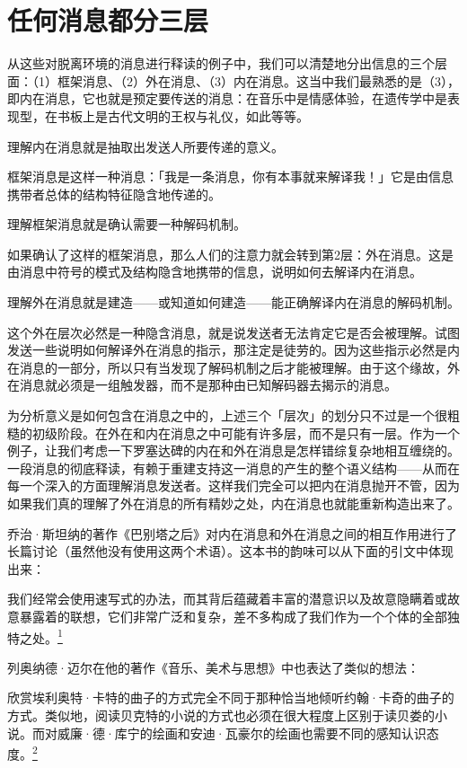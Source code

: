 \documentclass[
  12pt,
  twoside,
  openright,
  oldfontcommands,
]{memoir}
\newenvironment{fsquote}{%
  \begin{mdframed}[style=gebquote]\kaitifamily\small%
}{%
  \end{mdframed}%
}
\begin{document}
\section{任何消息都分三层}

从这些对脱离环境的消息进行释读的例子中，我们可以清楚地分出信息的三个层面：（1）框架消息、（2）外在消息、（3）内在消息。这当中我们最熟悉的是（3），即内在消息，它也就是预定要传送的消息：在音乐中是情感体验，在遗传学中是表现型，在书板上是古代文明的王权与礼仪，如此等等。

{理解内在消息就是抽取出发送人所要传递的意义。}

框架消息是这样一种消息：「我是一条消息，你有本事就来解译我！」它是由信息携带者总体的结构特征隐含地传递的。

{理解框架消息就是确认需要一种解码机制。}

如果确认了这样的框架消息，那么人们的注意力就会转到第2层：外在消息。这是由消息中符号的模式及结构隐含地携带的信息，说明如何去解译内在消息。

{理解外在消息就是建造------或知道如何建造------能正确解译内在消息的解码机制。}

这个外在层次必然是一种隐含消息，就是说发送者无法肯定它是否会被理解。试图发送一些说明如何解译外在消息的指示，那注定是徒劳的。因为这些指示必然是内在消息的一部分，所以只有当发现了解码机制之后才能被理解。由于这个缘故，外在消息就必须是一组触发器，而不是那种由已知解码器去揭示的消息。

为分析意义是如何包含在消息之中的，上述三个「层次」的划分只不过是一个很粗糙的初级阶段。在外在和内在消息之中可能有许多层，而不是只有一层。作为一个例子，让我们考虑一下罗塞达碑的内在和外在消息是怎样错综复杂地相互缠绕的。一段消息的彻底释读，有赖于重建支持这一消息的产生的整个语义结构------从而在每一个深入的方面理解消息发送者。这样我们完全可以把内在消息抛开不管，因为如果我们真的理解了外在消息的所有精妙之处，内在消息也就能重新构造出来了。

乔治·斯坦纳的著作《巴别塔之后》对内在消息和外在消息之间的相互作用进行了长篇讨论（虽然他没有使用这两个术语）。这本书的韵味可以从下面的引文中体现出来：

\begin{fsquote}
我们经常会使用速写式的办法，而其背后蕴藏着丰富的潜意识以及故意隐瞒着或故意暴露着的联想，它们非常广泛和复杂，差不多构成了我们作为一个个体的全部独特之处。\hyperref[fn:Chapter06-1]{\textsuperscript{1}}
\end{fsquote}

列奥纳德·迈尔在他的著作《音乐、美术与思想》中也表达了类似的想法：

\begin{fsquote}
欣赏埃利奥特·卡特的曲子的方式完全不同于那种恰当地倾听约翰·卡奇的曲子的方式。类似地，阅读贝克特的小说的方式也必须在很大程度上区别于读贝娄的小说。而对威廉·德·库宁的绘画和安迪·瓦豪尔的绘画也需要不同的感知认识态度。\hyperref[fn:Chapter06-2]{\textsuperscript{2}}
\end{fsquote}
\end{document}
